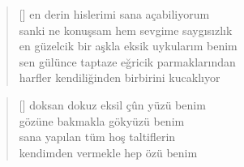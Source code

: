 \documentclass[10pt, openright, twoside]{memoir}
\theoremstyle{definition}
\begin{document}
\vspace*{\fill}
%
\newpage
{}
\vspace*{\fill}
\settowidth{\versewidth}{en güzelcik bir aşkla eksik uykularım benim}
\begin{verse}[\versewidth]
  en derin hislerimi sana açabiliyorum \\
  sanki ne konuşsam hem sevgime saygısızlık \\
  en güzelcik bir aşkla eksik uykularım benim \\
  sen gülünce taptaze eğricik parmaklarından \\
  harfler kendiliğinden birbirini kucaklıyor \\
\end{verse}
\vspace*{\fill}
%
\newpage
{}
\vspace*{\fill}
\settowidth{\versewidth}{doksan dokuz eksil çûn yüzü benim}
\begin{verse}[\versewidth]
  doksan dokuz eksil çûn yüzü benim \\
  gözüne bakmakla gökyüzü benim \\
  sana yapılan tüm hoş taltiflerin \\
  kendimden vermekle hep özü benim \\
\end{verse}
\vspace*{\fill}
%
\newpage
{}
\vspace*{\fill}
\settowidth{\versewidth}{var dersen eğer iğne ipliğe bunlardan bahsedersen}
\end{document}
